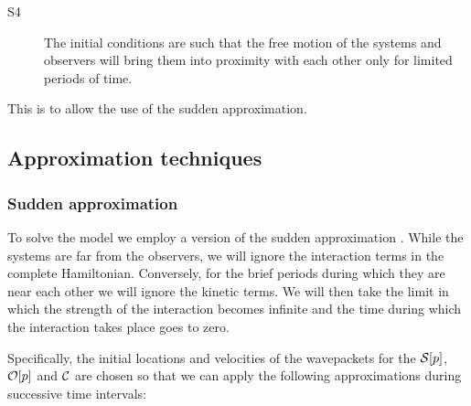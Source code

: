 \documentclass[12pt]{article}
\begin{document}
\begin{description}
\item[S4] The initial conditions are such that the free motion of the systems and observers
will bring them into proximity with each other only for limited periods of time.
\end{description}


This is to allow the use  of the sudden approximation.

\subsection{Approximation techniques}\label{SecApprox}


\subsubsection{Sudden approximation}\label{SecSudden}

To solve the model we employ a version of the sudden approximation \cite{Bohm51}.
While the systems are far from the observers, we will ignore the interaction terms in
the complete Hamiltonian. Conversely, for the brief periods during which they are near
each other we will ignore the kinetic terms. We will then take the limit in which the
strength of the interaction becomes infinite and the time during which the interaction
takes place goes to zero. 

Specifically, the initial locations and velocities of the wavepackets for the $\cS[p]$\/,
$\cO[p]$\/  and $\cC\/$\/ are chosen so that we can apply the following approximations
during successive time intervals:
\end{document}
